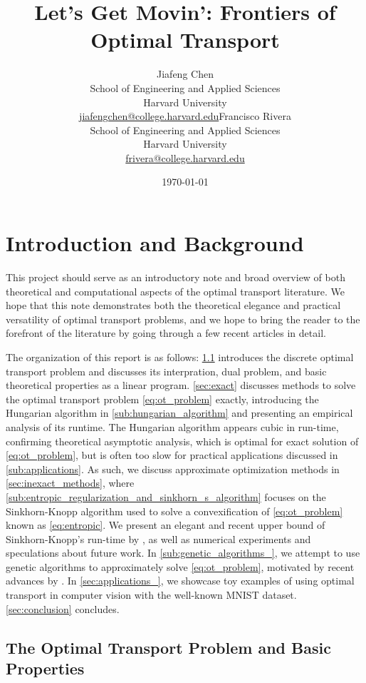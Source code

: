 \documentclass{article}
\title{Let's Get Movin': Frontiers of Optimal Transport}
\author{Jiafeng Chen\\School of Engineering and Applied Sciences\\Harvard University\\\url{jiafengchen@college.harvard.edu}\And Francisco Rivera\\School of Engineering and Applied Sciences\\Harvard University\\\url{frivera@college.harvard.edu}}
\date{\today}
\theoremstyle{definition}
\theoremstyle{remark}
\begin{document}
\maketitle
\section{Introduction and Background}

This project should serve as an introductory note and broad overview of both
 theoretical and computational aspects of the
 optimal transport literature. We hope that this note demonstrates both the
 theoretical elegance and practical versatility of optimal transport
 problems, and we hope to bring the reader to the forefront of the
 literature by going through a few recent articles in detail.

The organization of this report is as follows: \cref{sub:problem_intro}
introduces the discrete optimal transport problem and discusses its
interpration, dual problem, and basic theoretical properties as a linear
program. \cref{sec:exact} discusses methods to solve the optimal transport
problem \eqref{eq:ot_problem} exactly, introducing the Hungarian algorithm
\cite{kuhn2010hungarian} in \cref{sub:hungarian_algorithm} and presenting an
empirical analysis of its runtime. The Hungarian algorithm appears cubic in
run-time, confirming theoretical asymptotic analysis, which is optimal for exact
solution of \eqref{eq:ot_problem}, but is often too slow for practical
applications discussed in \cref{sub:applications}. As such, we discuss
approximate optimization methods in \cref{sec:inexact_methods}, where
\cref{sub:entropic_regularization_and_sinkhorn_s_algorithm} focuses on the
Sinkhorn-Knopp algorithm used to solve a convexification of
\eqref{eq:ot_problem} known as \ref{eq:entropic}. We present an elegant and
recent upper bound of Sinkhorn-Knopp's run-time by \cite{altschuler2017near}, as
well as numerical experiments and speculations about future work. In
\cref{sub:genetic_algorithms_}, we attempt to use genetic algorithms to
approximately solve \eqref{eq:ot_problem}, motivated by recent advances by
\cite{such2017deep}. In \cref{sec:applications_}, we showcase toy examples of
using optimal transport in computer vision with the well-known MNIST dataset.
\cref{sec:conclusion} concludes.
 
 

\subsection{The Optimal Transport Problem and Basic Properties}
\label{sub:problem_intro}
\end{document}
